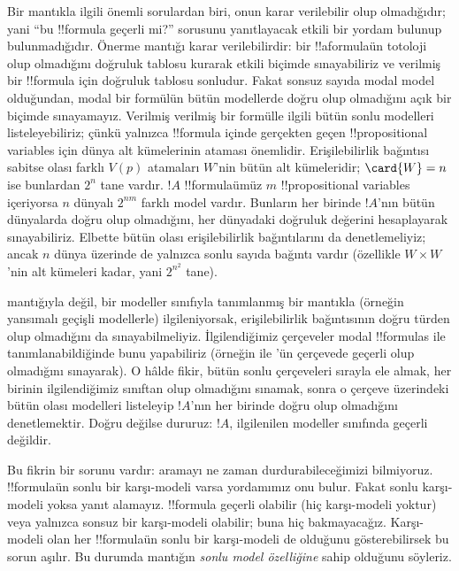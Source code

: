 \documentclass[../../../include/open-logic-section]{subfiles}
\begin{document}


Bir mantıkla ilgili önemli sorulardan biri, onun karar verilebilir olup
olmadığıdır; yani ``bu !!{formula} geçerli mi?'' sorusunu yanıtlayacak etkili
bir yordam bulunup bulunmadığıdır. Önerme mantığı karar verilebilirdir: bir
!!a{formula}{}ün totoloji olup olmadığını doğruluk tablosu kurarak etkili
biçimde sınayabiliriz ve verilmiş bir !!{formula} için doğruluk tablosu
sonludur. Fakat sonsuz sayıda modal model olduğundan, modal bir formülün
bütün modellerde doğru olup olmadığını açık bir biçimde sınayamayız. Verilmiş
  verilmiş bir formülle ilgili bütün sonlu modelleri listeleyebiliriz; çünkü yalnızca
!!{formula} içinde gerçekten geçen !!{propositional variable}s için dünya
alt kümelerinin ataması önemlidir. Erişilebilirlik bağıntısı sabitse olası
farklı $V(p)$ atamaları $W$'nin bütün alt kümeleridir; $\card{W}=n$ ise
bunlardan $2^n$ tane vardır. $!A$ !!{formula}{}ümüz $m$ !!{propositional
variable}s içeriyorsa $n$ dünyalı $2^{nm}$ farklı model vardır. Bunların her
  birinde $!A$'nın bütün dünyalarda doğru olup olmadığını, her dünyadaki
  doğruluk değerini hesaplayarak sınayabiliriz. Elbette bütün olası
erişilebilirlik bağıntılarını da denetlemeliyiz; ancak $n$ dünya üzerinde de
yalnızca sonlu sayıda bağıntı vardır (özellikle $W\times W$'nin alt kümeleri
kadar, yani $2^{n^2}$ tane).

   mantığıyla değil, bir modeller sınıfıyla tanımlanmış bir mantıkla
(örneğin yansımalı geçişli modellerle) ilgileniyorsak, erişilebilirlik
bağıntısının doğru türden olup olmadığını da sınayabilmeliyiz. İlgilendiğimiz
çerçeveler modal !!{formula}s ile tanımlanabildiğinde bunu yapabiliriz
(örneğin  ile 'ün çerçevede geçerli olup olmadığını sınayarak).
O hâlde fikir, bütün sonlu çerçeveleri sırayla ele almak, her birinin
ilgilendiğimiz sınıftan olup olmadığını sınamak, sonra o çerçeve üzerindeki
bütün olası modelleri listeleyip $!A$'nın her birinde doğru olup olmadığını
denetlemektir. Doğru değilse dururuz: $!A$, ilgilenilen modeller sınıfında
geçerli değildir.

Bu fikrin bir sorunu vardır: aramayı ne zaman durdurabileceğimizi bilmiyoruz.
!!{formula}{}ün sonlu bir karşı-modeli varsa yordamımız onu bulur. Fakat sonlu
karşı-modeli yoksa yanıt alamayız. !!{formula} geçerli olabilir (hiç
karşı-modeli yoktur) veya yalnızca sonsuz bir karşı-modeli olabilir; buna
hiç bakmayacağız. Karşı-modeli olan her !!{formula}{}ün sonlu bir karşı-modeli
de olduğunu gösterebilirsek bu sorun aşılır. Bu durumda mantığın
\emph{sonlu model özelliğine} sahip olduğunu söyleriz.
\end{document}
